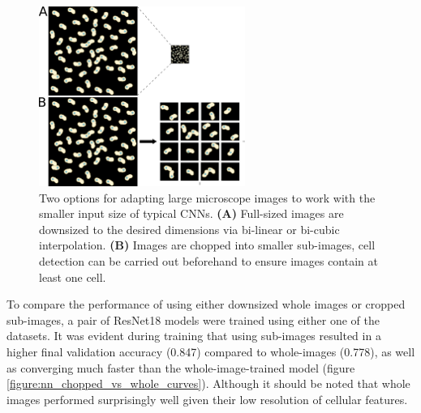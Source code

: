 \documentclass[a4paper,11pt,twoside,openright]{scrbook}
\begin{document}
\begin{figure}
    \includegraphics[width=0.6\textwidth]{ch2ImageChopping}
    \captionsetup{width=0.8\textwidth}
    \caption[Down-sizing and chopping images for CNN training]{Two options for adapting large microscope images to work with the smaller input size of typical CNNs. \textbf{(A)} Full-sized images are downsized to the desired dimensions via bi-linear or bi-cubic interpolation. \textbf{(B)} Images are chopped into smaller sub-images, cell detection can be carried out beforehand to ensure images contain at least one cell.}
    \label{figure:image_chopping}
\end{figure}

To compare the performance of using either downsized whole images or cropped sub-images, a pair of ResNet18 models were trained using either one of the datasets.
It was evident during training that using sub-images resulted in a higher final validation accuracy (0.847) compared to whole-images (0.778), as well as converging much faster than the whole-image-trained model (figure \ref{figure:nn_chopped_vs_whole_curves}).
Although it should be noted that whole images performed surprisingly well given their low resolution of cellular features.
\end{document}
